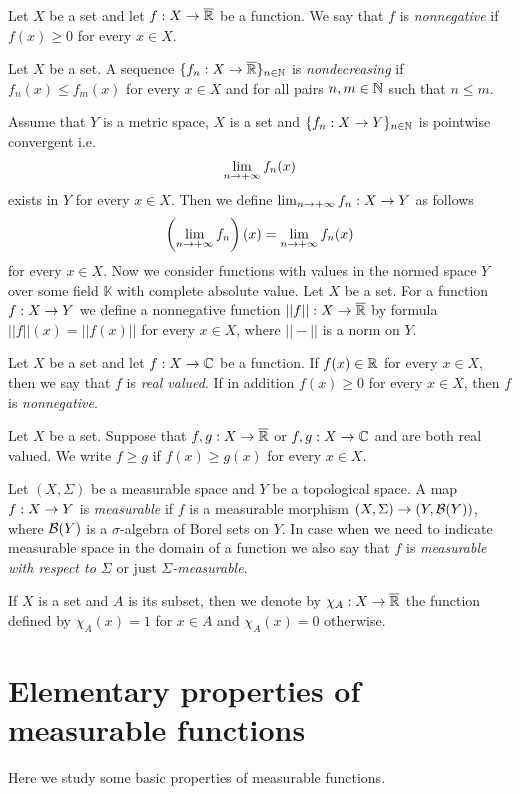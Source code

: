 \begin{definition}
Let $X$ be a set and let $f:X\rightarrow \overline{{\mathbb R}}$ be a function. We say that $f$ is \textit{nonnegative} if $f(x) \geq 0$ for every $x\in X$.
\end{definition}

\begin{definition}
Let $X$ be a set. A sequence $\{f_n:X\rightarrow \overline{{\mathbb R}}\}_{n\in {\mathbb N}}$ is \textit{nondecreasing} if $f_n(x) \leq f_m(x)$ for every $x\in X$ and for all pairs $n, m\in {\mathbb N}$ such that $n\leq m$.
\end{definition}
\noindent
Assume that $Y$ is a metric space, $X$ is a set and $\{f_n:X\rightarrow Y\}_{n\in {\mathbb N}}$ is pointwise convergent i.e.
$$\lim_{n\rightarrow +\infty}f_n(x)$$
exists in $Y$ for every $x\in X$. Then we define $\lim_{n\rightarrow +\infty}f_n:X\rightarrow Y$ as follows
$$\left(\lim_{n\rightarrow +\infty}f_n\right)(x) = \lim_{n\rightarrow +\infty}f_n(x)$$
for every $x\in X$. Now we consider functions with values in the normed space $Y$ over some field $\mathbb{K}$ with complete absolute value. Let $X$ be a set. For a function $f:X\rightarrow Y$ we define a nonnegative function $||f||:X\rightarrow \overline{{\mathbb R}}$ by formula $||f||(x) = ||f(x)||$ for every $x\in X$, where $||-||$ is a norm on $Y$.

\begin{definition}
Let $X$ be a set and let $f:X\rightarrow {\mathbb C}$ be a function. If $f(x)\in {\mathbb R}$ for every $x\in X$, then we say that $f$ is \textit{real valued}. If in addition $f(x)\geq 0$ for every $x\in X$, then $f$ is \textit{nonnegative}.
\end{definition}
\noindent
Let $X$ be a set. Suppose that $f,g:X\rightarrow \overline{{\mathbb R}}$ or $f,g:X\rightarrow {\mathbb C}$ and are both real valued. We write $f\geq g$ if $f(x)\geq g(x)$ for every $x\in X$.

\begin{definition}
Let $(X,\Sigma)$ be a measurable space and $Y$ be a topological space. A map $f:X\rightarrow Y$ is \textit{measurable} if $f$ is a measurable morphism $(X,\Sigma)\rightarrow (Y,{\mathcal B}(Y))$, where ${\mathcal B}(Y)$ is a $\sigma$-algebra of Borel sets on $Y$. In case when we need to indicate measurable space in the domain of a function we also say that $f$ is \textit{measurable with respect to $\Sigma$} or just \textit{$\Sigma$-measurable}. 
\end{definition}
\noindent
If $X$ is a set and $A$ is its subset, then we denote by $\chi_A:X\rightarrow \overline{{\mathbb R}}$ the function defined by $\chi_A(x)=1$ for $x\in A$ and $\chi_A(x)=0$ otherwise.

\section{Elementary properties of measurable functions}
\noindent
Here we study some basic properties of measurable functions.

